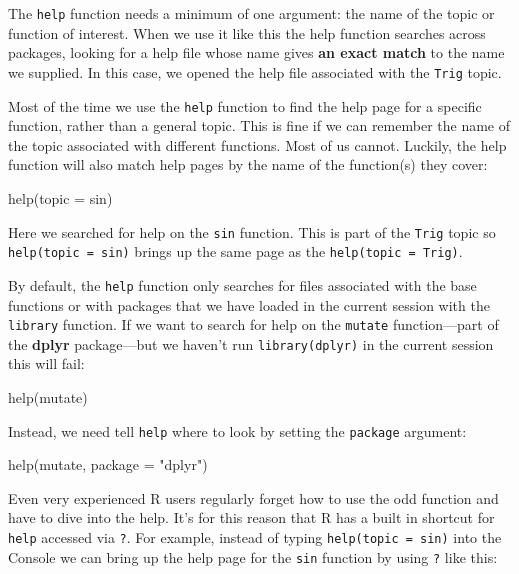\documentclass[
]{book}
\newenvironment{Shaded}{\begin{snugshade}}{\end{snugshade}}
\newcommand{\AttributeTok}[1]{\textcolor[rgb]{0.77,0.63,0.00}{#1}}
\newcommand{\FunctionTok}[1]{\textcolor[rgb]{0.00,0.00,0.00}{#1}}
\newcommand{\NormalTok}[1]{#1}
\newcommand{\StringTok}[1]{\textcolor[rgb]{0.31,0.60,0.02}{#1}}
\begin{document}
The \texttt{help} function needs a minimum of one argument: the name of the topic or function of interest. When we use it like this the help function searches across packages, looking for a help file whose name gives \textbf{an exact match} to the name we supplied. In this case, we opened the help file associated with the \texttt{Trig} topic.

Most of the time we use the \texttt{help} function to find the help page for a specific function, rather than a general topic. This is fine if we can remember the name of the topic associated with different functions. Most of us cannot. Luckily, the help function will also match help pages by the name of the function(s) they cover:

\begin{Shaded}
\begin{Highlighting}[]
\FunctionTok{help}\NormalTok{(}\AttributeTok{topic =}\NormalTok{ sin)}
\end{Highlighting}
\end{Shaded}

Here we searched for help on the \texttt{sin} function. This is part of the \texttt{Trig} topic so \texttt{help(topic\ =\ sin)} brings up the same page as the \texttt{help(topic\ =\ Trig)}.

By default, the \texttt{help} function only searches for files associated with the base functions or with packages that we have loaded in the current session with the \texttt{library} function. If we want to search for help on the \texttt{mutate} function---part of the \textbf{dplyr} package---but we haven't run \texttt{library(dplyr)} in the current session this will fail:

\begin{Shaded}
\begin{Highlighting}[]
\FunctionTok{help}\NormalTok{(mutate)}
\end{Highlighting}
\end{Shaded}

Instead, we need tell \texttt{help} where to look by setting the \texttt{package} argument:

\begin{Shaded}
\begin{Highlighting}[]
\FunctionTok{help}\NormalTok{(mutate, }\AttributeTok{package =} \StringTok{"dplyr"}\NormalTok{)}
\end{Highlighting}
\end{Shaded}

Even very experienced R users regularly forget how to use the odd function and have to dive into the help. It's for this reason that R has a built in shortcut for \texttt{help} accessed via \texttt{?}. For example, instead of typing \texttt{help(topic\ =\ sin)} into the Console we can bring up the help page for the \texttt{sin} function by using \texttt{?} like this:
\end{document}
